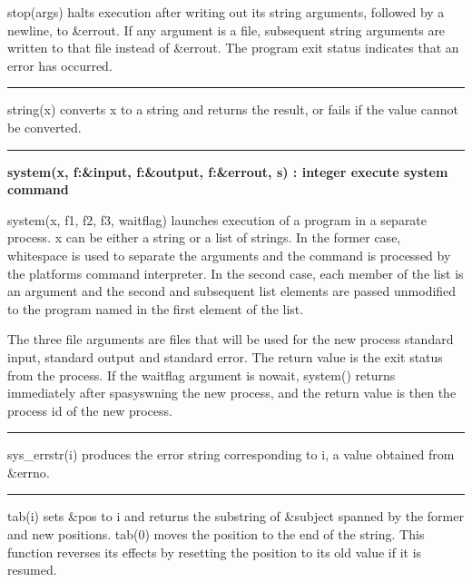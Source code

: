 \noindent
{}\textsf{stop(args)} halts execution after
writing out its string arguments, followed by a newline, to
\textsf{\&errout}. If any argument is a file, subsequent string
arguments are written to that file instead of \textsf{\&errout}. The
program exit status indicates that an error has occurred.

\bigskip\hrule\vspace{0.1cm}

\noindent
{}\textsf{string(x)} converts x
to a string and returns the result, or fails if the value cannot be
converted.

\bigskip\hrule\vspace{0.1cm}
\noindent
{\bf system(x, f:\&input, f:\&output, f:\&errout, s) : integer \hfill 
execute system command}

\noindent
{}\textsf{system(x, f1, f2, f3, waitflag)} launches
execution of a program in a separate process. \textsf{x} can be either
a string or a list of strings. In the former case, whitespace is used
to separate the arguments and the command is processed by the
platform{\textquotesingle}s command interpreter. In the second case,
each member of the list is an argument and the second and subsequent
list elements are passed unmodified to the program named in the first
element of the list.

The three file arguments are files that will be used for the new
process{\textquotesingle} standard input, standard output and standard
error. The return value is the exit status from the process. If the
\textsf{waitflag} argument is
\textsf{{\textquotedbl}nowait{\textquotedbl}}, \textsf{system()}
returns immediately after spasyswning the new process, and the return
value is then the process id of the new process.

\bigskip\hrule\vspace{0.1cm}

\noindent
{}\textsf{sys\_errstr(i)} produces the error string
corresponding to \textsf{i}, a value obtained from \textsf{\&errno}.

\bigskip\hrule\vspace{0.1cm}

\noindent
{}\textsf{tab(i)} sets \textsf{\&pos} to \textsf{i} and
returns the substring of \textsf{\&subject} spanned by the former and
new positions. \textsf{tab(0)} moves the position to the end of the
string. This function reverses its effects by resetting the position to
its old value if it is resumed.

